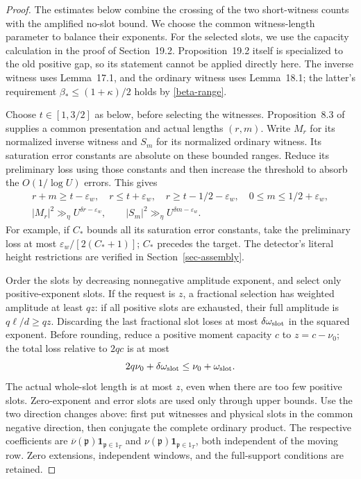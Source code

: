 \documentclass[10pt,reqno,a4paper]{amsart}
\theoremstyle{remark}
\newcommand{\one}{\mathbf 1}
\newcommand{\eps}{\varepsilon}
\newcommand{\pp}{\mathfrak p}
\newcommand{\bp}{\beta_*}
\begin{document}
\begin{proof}
The estimates below combine the crossing of the two short-witness
counts with the amplified no-slot bound. We choose the common
witness-length parameter to balance their exponents. For the selected
slots, we use the capacity calculation in the proof of Section~19.2.
Proposition~19.2 itself is specialized to the old positive gap, so its
statement cannot be applied directly here. The inverse witness uses Lemma~17.1, and the ordinary
witness uses Lemma~18.1; the latter's requirement
$\bp\le(1+\kappa)/2$ holds by \eqref{beta-range}.

Choose $t\in[1,3/2]$ as below, before selecting the witnesses.
Proposition~8.3 of \cite{q30} supplies a common presentation and actual
lengths $(r,m)$. Write $M_r$ for its normalized inverse witness and
$S_m$ for its normalized ordinary witness. Its saturation error constants
are absolute on these bounded ranges. Reduce its preliminary loss using those constants and
then increase the threshold to absorb the $O(1/\log U)$ errors. This
gives
\[
 \begin{gathered}
 r+m\ge t-\eps_w,\quad r\le t+\eps_w,\quad
 r\ge t-1/2-\eps_w,\quad 0\le m\le1/2+\eps_w,\\
 |M_r|^2\gg_\eta U^{\delta r-\eps_w},\qquad
 |S_m|^2\gg_\eta U^{\delta m-\eps_w}.
 \end{gathered}
\]
For example, if $C_*$ bounds all its saturation error constants, take
the preliminary loss at most $\eps_w/[2(C_*+1)]$; $C_*$ precedes the
target. The detector's literal height restrictions are verified in
Section~\ref{sec-assembly}.

Order the slots by decreasing nonnegative amplitude exponent, and
select only positive-exponent slots. If the request is $z$, a
fractional selection has weighted amplitude at least $qz$: if all
positive slots are exhausted, their full amplitude is $q\ell/d\ge qz$.
Discarding the last fractional slot loses at most
$\delta\omega_{\rm slot}$ in the squared exponent. Before rounding,
reduce a positive moment capacity $c$ to $z=c-\nu_0$; the total loss
relative to $2qc$ is at most
\[
       2q\nu_0+\delta\omega_{\rm slot}
                         \le\nu_0+\omega_{\rm slot}.
\]
The actual whole-slot length is at most $z$, even when there are too
few positive slots. Zero-exponent and error slots are used only through
upper bounds. Use the two direction changes above: first put witnesses
and physical slots in the common negative direction, then conjugate
the complete ordinary product. The respective coefficients are
$\overline\nu(\pp)\one_{\pp\in1_T}$ and
$\nu(\pp)\one_{\pp\in1_T}$, both independent of the moving row.
Zero extensions, independent windows, and the full-support
conditions are retained.


\end{proof}
\end{document}
